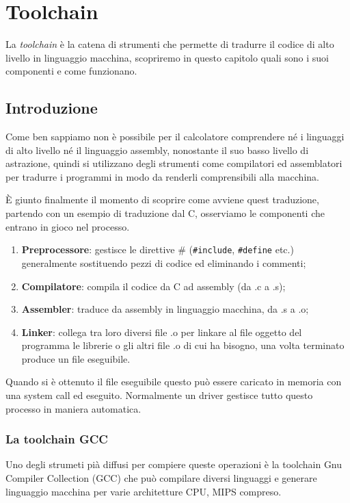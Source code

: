 \documentclass[class=book, crop=false, oneside]{standalone}
\begin{document}
\chapter{Toolchain}

La \emph{toolchain} è la catena di strumenti che permette di tradurre il codice di alto livello in linguaggio macchina, scopriremo in questo capitolo quali sono i suoi componenti e come funzionano.

\section{Introduzione}
Come ben sappiamo non è possibile per il calcolatore comprendere né i linguaggi di alto livello né il linguaggio assembly, nonostante il suo basso livello di astrazione, quindi si utilizzano degli strumenti come compilatori ed assemblatori per tradurre i programmi in modo da renderli comprensibili alla macchina.

È giunto finalmente il momento di scoprire come avviene quest traduzione, partendo con un esempio di traduzione dal C, osserviamo le componenti che entrano in gioco nel processo.
\begin{enumerate}
	\item \textbf{Preprocessore}: gestisce le direttive \# (\texttt{#include}, \texttt{#define} etc.) generalmente sostituendo pezzi di codice ed eliminando i commenti;
	\item \textbf{Compilatore}: compila il codice da C ad assembly (da .c a .s);
	\item \textbf{Assembler}: traduce da assembly in linguaggio macchina, da .s a .o;
	\item \textbf{Linker}: collega tra loro diversi file .o per linkare al file oggetto del programma le librerie o gli altri file .o di cui ha bisogno, una volta terminato produce un file eseguibile.
\end{enumerate}
Quando si è ottenuto il file eseguibile questo può essere caricato in memoria con una system call ed eseguito.
Normalmente un driver gestisce tutto questo processo in maniera automatica.

\subsection*{La toolchain GCC}
Uno degli strumeti pià diffusi per compiere queste operazioni è la toolchain Gnu Compiler Collection (GCC) che può compilare diversi linguaggi e generare linguaggio macchina per varie architetture CPU, MIPS compreso.
\end{document}
